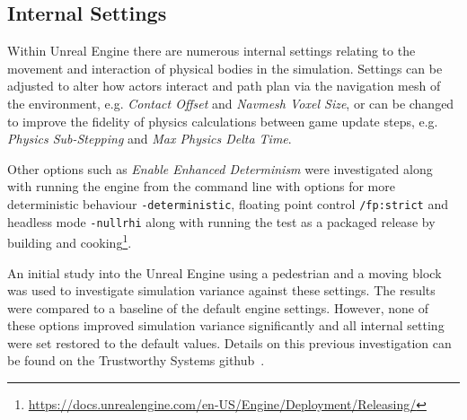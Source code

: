 \documentclass[letterpaper, 10 pt, journal, twoside]{IEEEtran}
\begin{document}


\subsection{Internal Settings}

Within Unreal Engine there are numerous internal settings relating to the movement and interaction of physical bodies in the simulation. Settings can be adjusted to alter how actors interact and path plan via the navigation mesh of the environment, e.g. \textit{Contact Offset} and \textit{Navmesh Voxel Size}, or can be changed to improve the fidelity of physics calculations between game update steps, e.g. \textit{Physics Sub-Stepping} and \textit{Max Physics Delta Time}. 

Other options such as \textit{Enable Enhanced Determinism} were investigated along with running the engine from the command line with options for more deterministic behaviour \texttt{-deterministic}, floating point control \texttt{/fp:strict} and headless mode \texttt{-nullrhi} along with running the test as a packaged release by building and cooking\footnote{\url{https://docs.unrealengine.com/en-US/Engine/Deployment/Releasing/}}. 


An initial study into the Unreal Engine using a pedestrian and a moving block was used to investigate simulation variance against these settings. The results were compared to a baseline of the default engine settings. 
%
However, none of these options improved simulation variance significantly and all internal setting were set restored to the default values. Details on this previous investigation can be found on the Trustworthy Systems github~\cite{TSLUnrealEngineTesting}.
\end{document}

